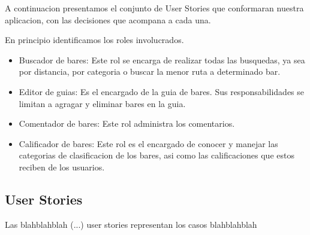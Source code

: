 \documentclass[10pt,a4paper]{article}
\begin{document}
A continuacion presentamos el conjunto de User Stories que conformaran nuestra aplicacion, con las decisiones que acompana a cada una.

En principio identificamos los roles involucrados.
\begin{itemize}
 \item Buscador de bares: Este rol se encarga de realizar todas las busquedas, ya sea por distancia, por categoria o buscar la menor ruta a determinado bar.
 \item Editor de guias: Es el encargado de la guia de bares. Sus responsabilidades se limitan a agragar y eliminar bares en la guia.
 \item Comentador de bares: Este rol administra los comentarios.
 \item Calificador de bares: Este rol es el encargado de conocer y manejar las categorias de clasificacion de los bares, asi como las calificaciones que estos reciben de los usuarios.
\end{itemize}

\subsection{User Stories}

Las blahblahblah (...) user stories representan los casos blahblahblah
\end{document}
